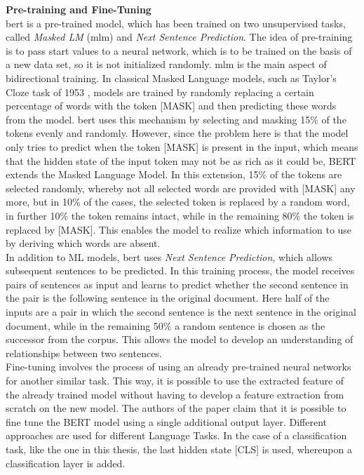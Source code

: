 \documentclass[a4paper, 11pt,titlepage,oneside,openany]{book}
\begin{document}
\noindent \textbf{Pre-training and Fine-Tuning}\\
\gls{bert} is a pre-trained model, which has been trained on two unsupervised tasks, called \textit{Masked LM} (\gls{mlm}) and \textit{Next Sentence Prediction}. The idea of pre-training is to pass start values to a neural network, which is to be trained on the basis of a new data set, so it is not initialized randomly.
\newpage
\noindent \gls{mlm} is the main aspect of bidirectional training. In classical Masked Language models, such as Taylor's Cloze task of 1953 \cite{cloze}, models are trained by randomly replacing a certain percentage of words with the token [MASK] and then predicting these words from the model. \gls{bert} uses this mechanism by selecting and masking 15\% of the tokens evenly and randomly. However, since the problem here is that the model only tries to predict when the token [MASK] is present in the input, which means that the hidden state of the input token may not be as rich as it could be, BERT extends the Masked Language Model. In this extension, 15\% of the tokens are selected randomly, whereby not all selected words are provided with [MASK] any more, but in 10\% of the cases, the selected token is replaced by a random word, in further 10\% the token remains intact, while in the remaining 80\% the token is replaced by [MASK]. This enables the model to realize which information to use by deriving which words are absent.\\
\noindent In addition to ML models, \gls{bert} uses \textit{Next Sentence Prediction}, which allows subsequent sentences to be predicted. In this training process, the model receives pairs of sentences as input and learns to predict whether the second sentence in the pair is the following sentence in the original document. Here half of the inputs are a pair in which the second sentence is the next sentence in the original document, while in the remaining 50\% a random sentence is chosen as the successor from the corpus. This allows the model to develop an understanding of relationships between two sentences. \\

\noindent Fine-tuning involves the process of using an already pre-trained neural networks for another similar task. This way, it is possible to use the extracted feature of the already trained model without having to develop a feature extraction from scratch on the new model. The authors of the paper claim that it is possible to fine tune the BERT model using a single additional output layer. Different approaches are used for different Language Tasks. In the case of a classification task, like the one in this thesis, the last hidden state [CLS] is used, whereupon a classification layer is added. 
\end{document}

